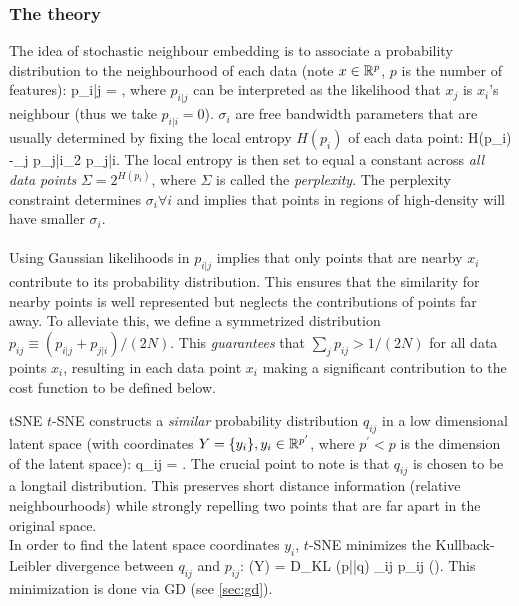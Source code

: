 \subsubsection{The theory}
The idea of stochastic neighbour embedding is to associate a probability distribution to the neighbourhood of each data (note $x\in \mathbb{R}^p$, $p$ is the number of features):
\be 
p_{i|j} = ,
\ee 
where $p_{i|j }$ can be interpreted as the likelihood that $x_j$ is $x_i$'s neighbour (thus we take $p_{i|i}=0$). $\sigma_i$ are free bandwidth parameters that are usually determined by fixing the local entropy $H(p_i)$ of each data point:
\be 
H(p_i) \equiv -\sum_j p_{j|i}\log_2 p_{j|i}.
\ee 
The local entropy is then set to equal a constant across \emph{all data points} $\Sigma = 2^{H(p_i)}$, where $\Sigma$ is called the \emph{perplexity}. The perplexity constraint determines $\sigma_i \forall i$ and implies that points in regions of high-density will have smaller $\sigma_i$.\\
\\
Using Gaussian likelihoods in $p_{i|j}$ implies that only points that are nearby $x_i$ contribute to its probability distribution. This ensures that the similarity for nearby points is well represented but neglects the contributions of points far away. To alleviate this, we define a symmetrized distribution $p_{ij} \equiv (p_{i|j}+p_{j|i})/(2N)$. This \emph{guarantees} that $\sum_j p_{ij} >1/(2N)$ for all data points $x_i$, resulting in each data point $x_i$ making a significant contribution to the cost function to be defined below.
\begin{mybox}{tSNE}
	$t$-SNE constructs a \emph{similar} probability distribution $q_{ij}$ in a low dimensional latent space (with coordinates $Y=\{y_i\}, y_i \in \mathbb{R}^{p^\prime}$, where $p^\prime <p$ is the dimension of the latent space):
	\be 
	\label{eq:dimRedTSNEprobdistr}
	q_{ij} = .
	\ee 
	The crucial point to note is that $q_{ij}$ is chosen to be a longtail distribution. This preserves short distance information (relative neighbourhoods) while strongly repelling two points that are far apart in the original space.\\
	In order to find the latent space coordinates $y_i$, $t$-SNE minimizes the Kullback-Leibler divergence between $q_{ij}$ and $p_{ij}$:
	\be 
	\label{eq:dimRedTSNECostfct}
	\mC(Y) = D_{KL} (p||q) \equiv \sum_{ij} p_{ij} \log\left(\right).
	\ee 
	This minimization is done via GD (see \ref{sec:gd}).
\end{mybox}
